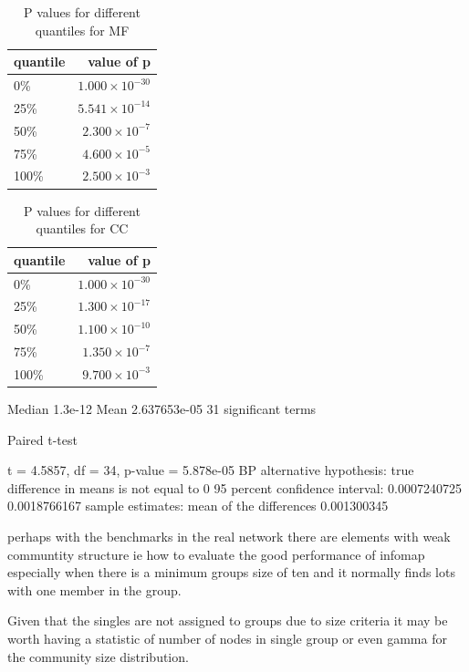 \begin{table}[ht]
\centering
\begin{tabular}{lr}
  \hline
quantile & value of p \\ 
  \hline
0\% & $1.000 \times 10^{-30}$ \\ 
  25\% & $5.541 \times 10^{-14}$ \\ 
  50\% & $2.300 \times 10^{-7}$ \\ 
  75\% & $4.600 \times 10^{-5}$ \\ 
  100\% & $2.500 \times 10^{-3}$ \\ 
   \hline
\end{tabular}
\caption{P values for different quantiles for MF} 
\label{tabP values for different quantiles for MF}
\end{table}

\begin{table}[ht]
\centering
\begin{tabular}{lr}
  \hline
quantile & value of p \\ 
  \hline
0\% & $1.000 \times 10^{-30}$ \\ 
  25\% & $1.300 \times 10^{-17}$ \\ 
  50\% & $1.100 \times 10^{-10}$ \\ 
  75\% & $1.350 \times 10^{-7}$ \\ 
  100\% & $9.700 \times 10^{-3}$ \\ 
   \hline
\end{tabular}
\caption{P values for different quantiles for CC} 
\label{tabP values for different quantiles for CC}
\end{table}
Median 1.3e-12
Mean 2.637653e-05
31 significant terms


	Paired t-test


t = 4.5857, df = 34, p-value = 5.878e-05 BP
alternative hypothesis: true difference in means is not equal to 0
95 percent confidence interval:
 0.0007240725 0.0018766167
sample estimates:
mean of the differences 
            0.001300345 

perhaps with the benchmarks in the real network there are elements with weak communtity structure ie how to evaluate the good performance of infomap especially when there is a minimum groups size of ten and it normally finds lots with one member in the group.    

Given that the singles are not assigned to groups due to size criteria it may be worth having a statistic of number of nodes in single group or even gamma for the community size distribution.


